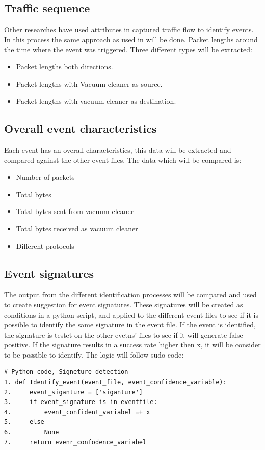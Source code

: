\subsection{Traffic sequence}
Other researches have used attributes in captured traffic flow to identify events. In this process the same approach as used in \cite{pingpong} will be done. Packet lengths around the time where the event was triggered. Three different types will be extracted: 
\begin{itemize}
    \item Packet lengths both directions.
    \item Packet lengths with Vacuum cleaner as source.
    \item Packet lengths with vacuum cleaner as destination.
\end{itemize}

\subsection{Overall event characteristics}
Each event has an overall characteristics, this data will be extracted and compared against the other event files. The data which will be compared is: 
\begin{itemize}
    \item Number of packets
    \item Total bytes
    \item Total bytes sent from vacuum cleaner
    \item Total bytes received as vacuum cleaner
    \item Different protocols
\end{itemize}

\subsection{Event signatures}
The output from the different identification processes will be compared and used to create suggestion for event signatures. These signatures will be created as conditions in a python script, and applied to the different event files to see if it is possible to identify the same signature in the event file. 
If the event is identified, the signature is testet on the other evetns' files to see if it will generate false positive. If the signature results in a success rate higher then x, it will be consider to be possible to identify. The logic will follow sudo code:
\\ 
\begin{lstlisting}
# Python code, Signeture detection
1. def Identify_event(event_file, event_confidence_variable):
2.     event_siganture = ['siganture']
3.     if event_signature is in eventfile:
4.         event_confident_variabel =+ x
5.     else
6.         None
7.     return evenr_confodence_variabel
\end{lstlisting}


